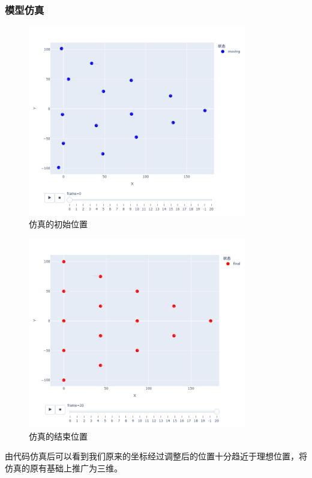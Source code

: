 \documentclass[withoutpreface,bwprint]{cumcmthesis} %
\begin{document}
\subsubsection{模型仿真}
\begin{figure}[htbp]
    \centering
    \includegraphics[width=0.85\textwidth]{../../figure/start_4.png} 
    \caption{仿真的初始位置}
    \label{q4_2}    
\end{figure}
\begin{figure}[htbp]
    \centering
    \includegraphics[width=0.85\textwidth]{../../figure/end_4.png} 
    \caption{仿真的结束位置}
    \label{q4_2}    
\end{figure}
由代码仿真后可以看到我们原来的坐标经过调整后的位置十分趋近于理想位置，将仿真的原有基础上推广为三维。
\end{document}
